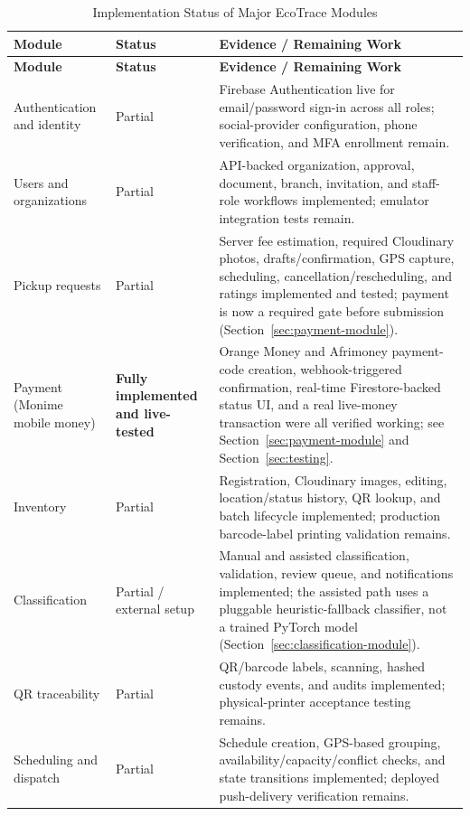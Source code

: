 \begin{longtable}{@{}p{3.6cm}p{2.4cm}p{7.2cm}@{}}
\caption{Implementation Status of Major EcoTrace Modules} \label{tab:module-status} \\
\toprule \textbf{Module} & \textbf{Status} & \textbf{Evidence / Remaining Work} \\ \midrule
\endfirsthead
\toprule \textbf{Module} & \textbf{Status} & \textbf{Evidence / Remaining Work} \\ \midrule
\endhead
Authentication and identity & Partial & Firebase Authentication live for email/password sign-in across all roles; social-provider configuration, phone verification, and MFA enrollment remain. \\
Users and organizations & Partial & API-backed organization, approval, document, branch, invitation, and staff-role workflows implemented; emulator integration tests remain. \\
Pickup requests & Partial & Server fee estimation, required Cloudinary photos, drafts/confirmation, GPS capture, scheduling, cancellation/rescheduling, and ratings implemented and tested; payment is now a required gate before submission (Section~\ref{sec:payment-module}). \\
Payment (Monime mobile money) & \textbf{Fully implemented and live-tested} & Orange Money and Afrimoney payment-code creation, webhook-triggered confirmation, real-time Firestore-backed status UI, and a real live-money transaction were all verified working; see Section~\ref{sec:payment-module} and Section~\ref{sec:testing}. \\
Inventory & Partial & Registration, Cloudinary images, editing, location/status history, QR lookup, and batch lifecycle implemented; production barcode-label printing validation remains. \\
Classification & Partial / external setup & Manual and assisted classification, validation, review queue, and notifications implemented; the assisted path uses a pluggable heuristic-fallback classifier, not a trained PyTorch model (Section~\ref{sec:classification-module}). \\
QR traceability & Partial & QR/barcode labels, scanning, hashed custody events, and audits implemented; physical-printer acceptance testing remains. \\
Scheduling and dispatch & Partial & Schedule creation, GPS-based grouping, availability/capacity/conflict checks, and state transitions implemented; deployed push-delivery verification remains. \\

\end{longtable}
